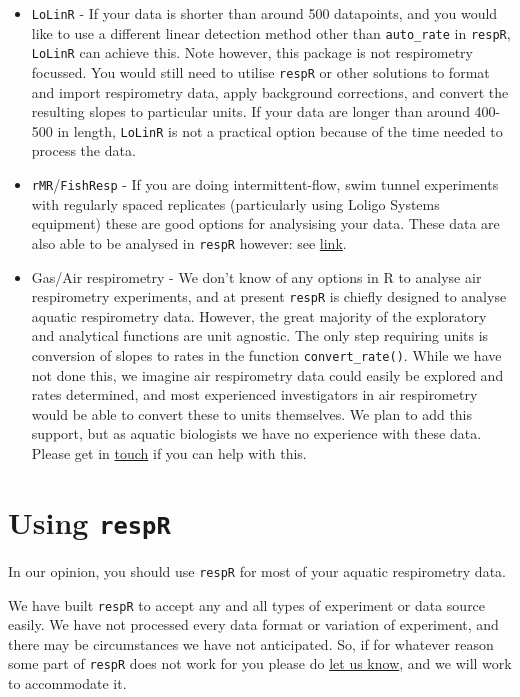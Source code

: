 \documentclass[]{book}
\begin{document}
\begin{itemize}
\item
  \texttt{LoLinR} - If your data is shorter than around 500 datapoints,
  and you would like to use a different linear detection method other
  than \texttt{auto\_rate} in \texttt{respR}, \texttt{LoLinR} can
  achieve this. Note however, this package is not respirometry focussed.
  You would still need to utilise \texttt{respR} or other solutions to
  format and import respirometry data, apply background corrections, and
  convert the resulting slopes to particular units. If your data are
  longer than around 400-500 in length, \texttt{LoLinR} is not a
  practical option because of the time needed to process the data.
\item
  \texttt{rMR}/\texttt{FishResp} - If you are doing intermittent-flow,
  swim tunnel experiments with regularly spaced replicates (particularly
  using Loligo Systems equipment) these are good options for analysising
  your data. These data are also able to be analysed in \texttt{respR}
  however: see
  \href{https://januarharianto.github.io/respR/articles/intermittent2.html}{link}.
\item
  Gas/Air respirometry - We don't know of any options in R to analyse
  air respirometry experiments, and at present \texttt{respR} is chiefly
  designed to analyse aquatic respirometry data. However, the great
  majority of the exploratory and analytical functions are unit
  agnostic. The only step requiring units is conversion of slopes to
  rates in the function \texttt{convert\_rate()}. While we have not done
  this, we imagine air respirometry data could easily be explored and
  rates determined, and most experienced investigators in air
  respirometry would be able to convert these to units themselves. We
  plan to add this support, but as aquatic biologists we have no
  experience with these data. Please get in
  \href{mailto:nicholascarey@gmail.com}{touch} if you can help with
  this.
\end{itemize}

\section{\texorpdfstring{Using
\texttt{respR}}{Using respR}}\label{using-respr}

In our opinion, you should use \texttt{respR} for most of your aquatic
respirometry data.

We have built \texttt{respR} to accept any and all types of experiment
or data source easily. We have not processed every data format or
variation of experiment, and there may be circumstances we have not
anticipated. So, if for whatever reason some part of \texttt{respR} does
not work for you please do \href{mailto:nicholascarey@gmail.com}{let us
know}, and we will work to accommodate it.
\end{document}
